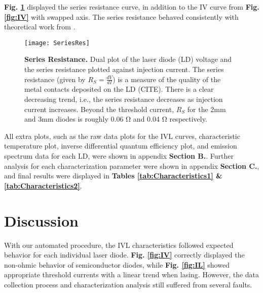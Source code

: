 \documentclass[9pt,twocolumn,twoside]{osajnl}
\begin{document}
\textbf{Fig. \ref{fig:SerRes}} displayed the series resistance curve, in addition to the IV curve from \textbf{Fig. \ref{fig:IV}} with swapped axis. The series resistance behaved consistently with theoretical work from \cite{paul}.

\begin{figure}[hbtp]
\centering
\texttt{[image: SeriesRes]}
\caption{\textbf{Series Resistance.} Dual plot of the laser diode (LD) voltage and the series resistance plotted against injection current. The series resistance (given by $R_S = \frac{dV}{dI}$) is a measure of the quality of the metal contacts deposited on the LD (CITE). There is a clear decreasing trend, i.e., the series resistance decreases as injection current increases. Beyond the threshold current, $R_S$ for the 2mm and 3mm diodes is roughly 0.06 Ω and 0.04 Ω respectively.}
\label{fig:SerRes}
\end{figure}

All extra plots, such as the raw data plots for the IVL curves, characteristic temperature plot, inverse differential quantum efficiency plot, and emission spectrum data for each LD, were shown in appendix \textbf{Section B.}. Further analysis for each characterization parameter were shown in appendix \textbf{Section C.}, and final results were displayed in \textbf{Tables \ref{tab:Characteristics1} \& \ref{tab:Characteristics2}}.



\section{Discussion}

\indent \indent With our automated procedure, the IVL characteristics followed expected behavior for each individual laser diode. \textbf{Fig. \ref{fig:IV}} correctly displayed the non-ohmic behavior of semiconductor diodes, while \textbf{Fig. \ref{fig:IL}} showed appropriate threshold currents with a linear trend when lasing. However, the data collection process and characterization analysis still suffered from several faults.  
\end{document}
